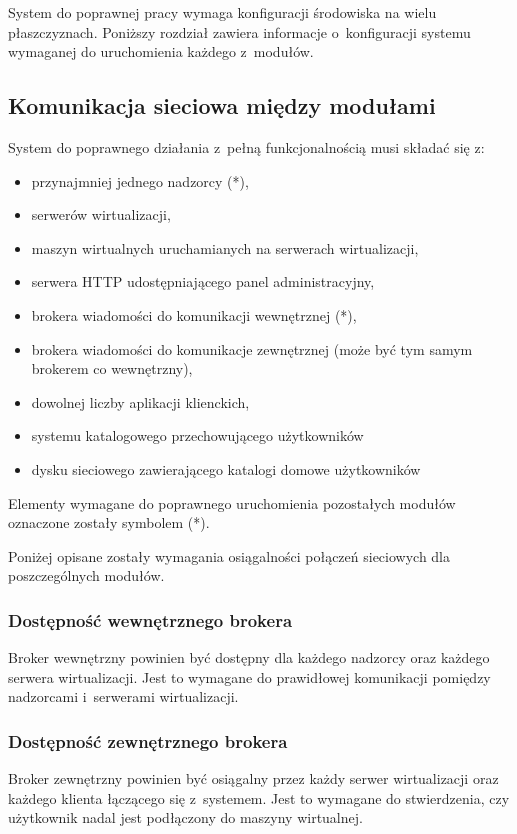 \documentclass[../opis-rozwiazania.tex]{subfiles}
\begin{document}
\label{system_requirements}

System do poprawnej pracy wymaga konfiguracji środowiska na wielu płaszczyznach. Poniższy rozdział zawiera informacje o~konfiguracji systemu wymaganej do uruchomienia każdego z~modułów.

\subsection{Komunikacja sieciowa między modułami}
System do poprawnego działania z~pełną funkcjonalnością musi składać się z:
\begin{itemize}
  \item przynajmniej jednego nadzorcy (*),
  \item serwerów wirtualizacji,
  \item maszyn wirtualnych uruchamianych na serwerach wirtualizacji,
  \item serwera HTTP udostępniającego panel administracyjny,
  \item brokera wiadomości do komunikacji wewnętrznej (*),
  \item brokera wiadomości do komunikacje zewnętrznej (może być tym samym brokerem co wewnętrzny),
  \item dowolnej liczby aplikacji klienckich,
  \item systemu katalogowego przechowującego użytkowników
  \item dysku sieciowego zawierającego katalogi domowe użytkowników
\end{itemize}
Elementy wymagane do poprawnego uruchomienia pozostałych modułów oznaczone zostały symbolem (*).

Poniżej opisane zostały wymagania osiągalności połączeń sieciowych dla poszczególnych modułów.

\subsubsection{Dostępność wewnętrznego brokera}
Broker wewnętrzny powinien być dostępny dla każdego nadzorcy oraz każdego serwera wirtualizacji.
Jest to wymagane do prawidłowej komunikacji pomiędzy nadzorcami i~serwerami wirtualizacji.

\subsubsection{Dostępność zewnętrznego brokera}
Broker zewnętrzny powinien być osiągalny przez każdy serwer wirtualizacji oraz każdego klienta łączącego się z~systemem.
Jest to wymagane do stwierdzenia, czy użytkownik nadal jest podłączony do maszyny wirtualnej.
\end{document}
